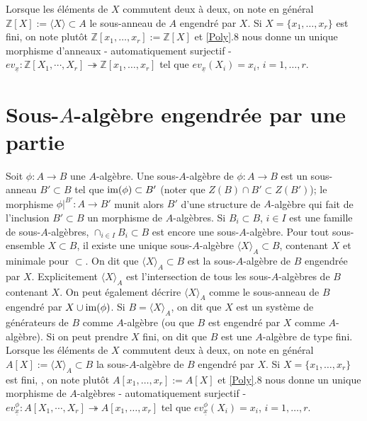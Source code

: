 \documentclass[a4paper, oneside, 12pt]{book}
\theoremstyle{definition} %
\newcommand{\Z}{\mathbb{Z}}
\begin{document}
 Lorsque les éléments de $X$ commutent deux à deux, on note en général $\Z[X]:=\langle X\rangle \subset A$ le sous-anneau de $A$ engendré par $X$. Si  $X=\lbrace x_1,\dots,x_r\rbrace $ est fini, on note plutôt $\Z[x_1,\dots,x_r]:=\Z[X]$ et \ref{Poly}.8  nous donne un unique morphisme d'anneaux - automatiquement  surjectif - $ev_{\underline{x}}:\Z[X_1,\cdots, X_r]\twoheadrightarrow \Z[x_1,\dots,x_r] $ tel que $ev_{\underline{x}}(X_i)=x_i$, $i=1,\dots, r$.   \\
 
  \section{Sous-$A$-algèbre engendrée par une partie}\label{SousAlg} Soit $\phi:A\rightarrow B$ une $A$-algèbre. Une sous-$A$-algèbre de $\phi:A\rightarrow B$ est un sous-anneau $B'\subset B$ tel que $\hbox{\rm im}(\phi)\subset B'$ (noter que $Z(B)\cap B'\subset Z(B')$); le morphisme $\phi|^{B'}:A\rightarrow B'$ munit alors $B'$ d'une structure de $A$-algèbre qui fait de l'inclusion $B'\subset B$ un morphisme de $A$-algèbres. Si    $B_i\subset B$, $i\in I$ est une famille de sous-$A$-algèbres, $\cap_{i\in I}B_i\subset B$  est encore une sous-$A$-algèbre. Pour tout sous-ensemble $X\subset B$, il existe 
une unique sous-$A$-algèbre $\langle X\rangle_A \subset B$, contenant $X$ et minimale pour $\subset$. On dit que $\langle X\rangle_A\subset B$ est la sous-$A$-algèbre de $B$ engendrée par $X$. Explicitement $\langle X\rangle_A$ est l'intersection de tous les sous-$A$-algèbres de $B$ contenant $X$. On peut également décrire $\langle X\rangle_A$ comme  le sous-anneau de $B$ engendré par $X\cup\hbox{\rm im}(\phi)$. Si $B=\langle X\rangle_A$, on dit que $X$ est un système de générateurs de $B$ comme $A$-algèbre (ou que $B$ est engendré par $X$ comme $A$-algèbre). Si on peut prendre $X$ fini, on dit que $B$ est une $A$-algèbre de type fini.\\

 Lorsque les éléments de $X$ commutent deux à deux, on note en général $A[X]:=\langle X\rangle_A \subset B$ la sous-$A$-algèbre de $B$ engendré par $X$. Si  $X=\lbrace x_1,\dots,x_r\rbrace $ est fini, , on note plutôt $A[x_1,\dots,x_r]:=A[X]$ et  \ref{Poly}.8  nous donne un unique morphisme de $A$-algèbres - automatiquement  surjectif - $ev_{\underline{x}}^\phi:A[X_1,\cdots, X_r]\twoheadrightarrow A[x_1,\dots, x_r] $ tel que $ev^\phi_{\underline{x}}(X_i)=x_i$, $i=1,\dots, r$. \\
\end{document}
